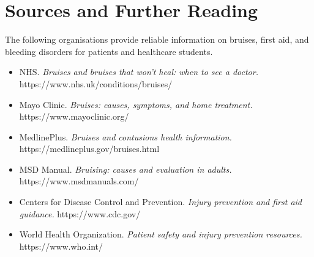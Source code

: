 \section*{Sources and Further Reading}
The following organisations provide reliable information on bruises, first aid, and bleeding disorders for patients and healthcare students.

\begin{itemize}
    \item NHS. \textit{Bruises and bruises that won't heal: when to see a doctor.} https://www.nhs.uk/conditions/bruises/
    \item Mayo Clinic. \textit{Bruises: causes, symptoms, and home treatment.} https://www.mayoclinic.org/
    \item MedlinePlus. \textit{Bruises and contusions health information.} https://medlineplus.gov/bruises.html
    \item MSD Manual. \textit{Bruising: causes and evaluation in adults.} https://www.msdmanuals.com/
    \item Centers for Disease Control and Prevention. \textit{Injury prevention and first aid guidance.} https://www.cdc.gov/
    \item World Health Organization. \textit{Patient safety and injury prevention resources.} https://www.who.int/
\end{itemize}
